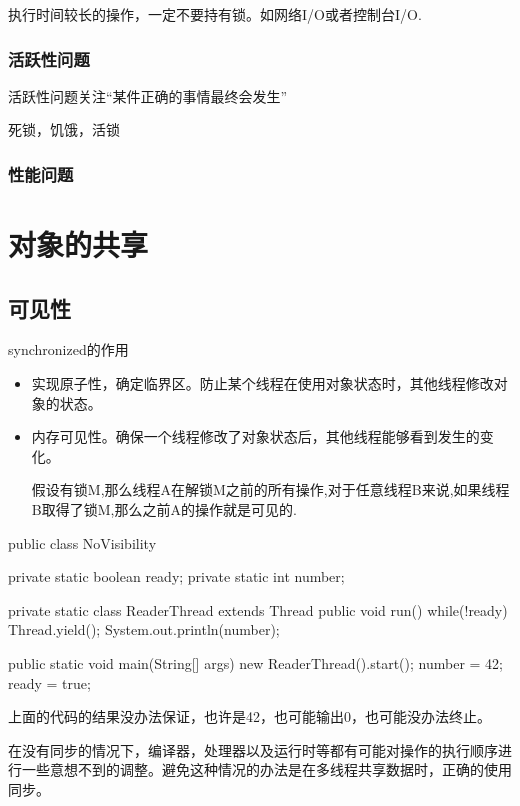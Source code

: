 执行时间较长的操作，一定不要持有锁。如网络I/O或者控制台I/O.



\subsubsection{活跃性问题}

活跃性问题关注“某件正确的事情最终会发生”

死锁，饥饿，活锁

\subsubsection{性能问题}

\section{对象的共享}

\subsection{可见性}

synchronized的作用
\begin{itemize}
\item 实现原子性，确定临界区。防止某个线程在使用对象状态时，其他线程修改对象的状态。
\item 内存可见性。确保一个线程修改了对象状态后，其他线程能够看到发生的变化。

假设有锁M,那么线程A在解锁M之前的所有操作,对于任意线程B来说,如果线程B取得了锁M,那么之前A的操作就是可见的.
\end{itemize}

\begin{Java}
public class NoVisibility {
	private static boolean ready;
	private static int number;
	
	private static class ReaderThread extends Thread {
		public void run() {
			while(!ready){
				Thread.yield();
			}
			System.out.println(number);
		}
	}
	
	public static void main(String[] args) {
		new ReaderThread().start();
		number = 42;
		ready = true;
	}
}
\end{Java}

上面的代码的结果没办法保证，也许是42，也可能输出0，也可能没办法终止。

在没有同步的情况下，编译器，处理器以及运行时等都有可能对操作的执行顺序进行一些意想不到的调整。避免这种情况的办法是在多线程共享数据时，正确的使用同步。


